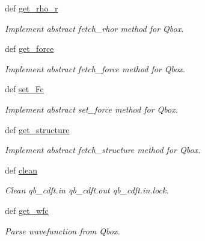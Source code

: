 \begin{DoxyCompactItemize}
def \hyperlink{classpycdft_1_1dft__driver_1_1qbox__driver_1_1QboxDriver_afa29050fa90a8586389b36fa77a2e076}{get\-\_\-rho\-\_\-r}
\begin{DoxyCompactList}\small\item\em Implement abstract fetch\-\_\-rhor method for Qbox. \end{DoxyCompactList}\item 
def \hyperlink{classpycdft_1_1dft__driver_1_1qbox__driver_1_1QboxDriver_af4b1d6e55d0511ea8e8ec4792a8193ef}{get\-\_\-force}
\begin{DoxyCompactList}\small\item\em Implement abstract fetch\-\_\-force method for Qbox. \end{DoxyCompactList}\item 
def \hyperlink{classpycdft_1_1dft__driver_1_1qbox__driver_1_1QboxDriver_afeae534fe966c097bfd21a341628e2b5}{set\-\_\-\-Fc}
\begin{DoxyCompactList}\small\item\em Implement abstract set\-\_\-force method for Qbox. \end{DoxyCompactList}\item 
def \hyperlink{classpycdft_1_1dft__driver_1_1qbox__driver_1_1QboxDriver_a6cce53566b9e443bf961ca371a8c9360}{get\-\_\-structure}
\begin{DoxyCompactList}\small\item\em Implement abstract fetch\-\_\-structure method for Qbox. \end{DoxyCompactList}\item 
\hypertarget{classpycdft_1_1dft__driver_1_1qbox__driver_1_1QboxDriver_a5db17c3ce62425de455b38eff759e0bc}{def \hyperlink{classpycdft_1_1dft__driver_1_1qbox__driver_1_1QboxDriver_a5db17c3ce62425de455b38eff759e0bc}{clean}}\label{classpycdft_1_1dft__driver_1_1qbox__driver_1_1QboxDriver_a5db17c3ce62425de455b38eff759e0bc}

\begin{DoxyCompactList}\small\item\em Clean qb\-\_\-cdft.\-in qb\-\_\-cdft.\-out qb\-\_\-cdft.\-in.\-lock. \end{DoxyCompactList}\item 
def \hyperlink{classpycdft_1_1dft__driver_1_1qbox__driver_1_1QboxDriver_a27981f1558fd63dfe053ec676fdcd2bf}{get\-\_\-wfc}
\begin{DoxyCompactList}\small\item\em Parse wavefunction from Qbox. \end{DoxyCompactList}\end{DoxyCompactItemize}

